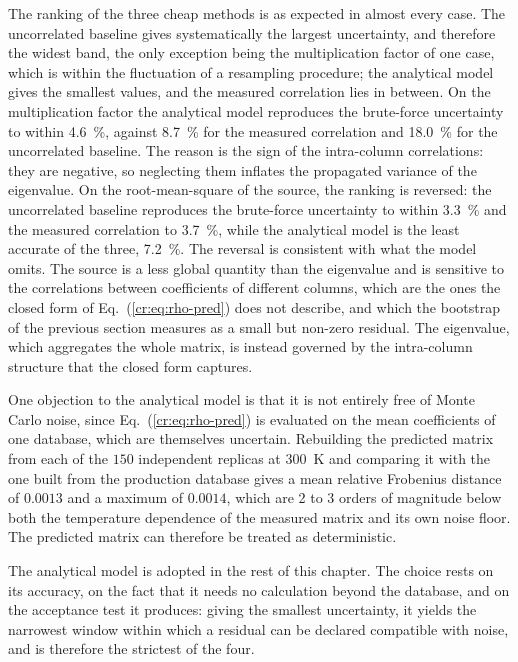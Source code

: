 The ranking of the three cheap methods is as expected in almost every case. The uncorrelated
baseline gives systematically the largest uncertainty, and therefore the widest
band, the only exception being the multiplication factor of one case, which is
within the fluctuation of a resampling procedure; the analytical model gives
the smallest values, and the measured correlation lies in between. On the
multiplication factor the analytical model reproduces the brute-force
uncertainty to within \SI{4.6}{\percent}, against \SI{8.7}{\percent} for the measured
correlation and \SI{18.0}{\percent} for the uncorrelated baseline. The reason is the sign of the intra-column correlations:
they are negative, so neglecting them inflates the propagated variance of the
eigenvalue. On the root-mean-square of the source, the ranking is reversed: the
uncorrelated baseline reproduces the brute-force uncertainty to within
\SI{3.3}{\percent} and the measured correlation to \SI{3.7}{\percent}, while
the analytical model is the least accurate of the three, \SI{7.2}{\percent}.
The reversal is consistent with what the model omits. The source is a less
global quantity than the eigenvalue and is sensitive to the correlations
between coefficients of different columns, which are the ones the
closed form of Eq.~(\ref{cr:eq:rho-pred}) does not describe, and which the
bootstrap of the previous section measures as a small but non-zero residual.
The eigenvalue, which aggregates the whole matrix, is instead governed by the
intra-column structure that the closed form captures.

One objection to the analytical model is that it is not entirely free of Monte Carlo noise, since
Eq.~(\ref{cr:eq:rho-pred}) is evaluated on the mean coefficients of one
database, which are themselves uncertain. Rebuilding the predicted
matrix from each of the $150$ independent replicas at \SI{300}{K} and comparing
it with the one built from the production database gives a mean relative
Frobenius distance of $0.0013$ and a maximum of $0.0014$, which are 2 to 3 orders
of magnitude below both the temperature dependence of the measured matrix and
its own noise floor. The predicted matrix can therefore be treated as
deterministic.

The analytical model is adopted in the rest of this chapter. The choice rests
on its accuracy, on the fact that it needs no calculation beyond the database,
and on the acceptance test it produces: giving the smallest uncertainty, it
yields the narrowest window within which a residual can be declared compatible
with noise, and is therefore the strictest of the four.

